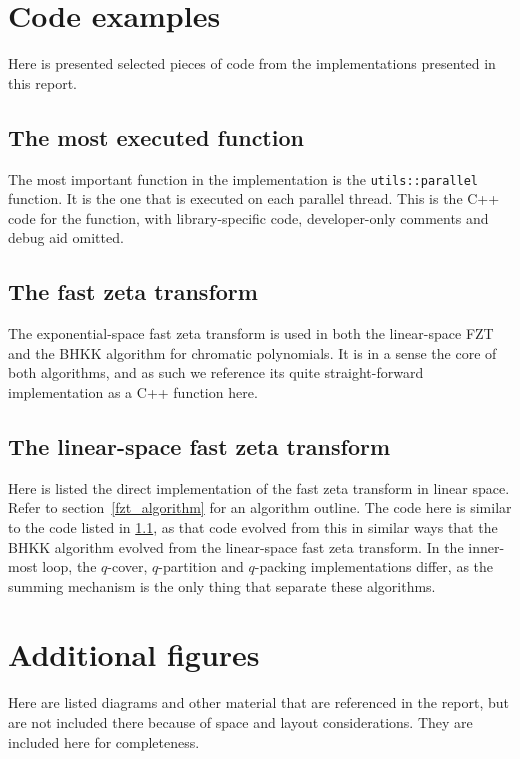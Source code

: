 \documentclass{cslthse-msc}
\newcommand{\code}{\texttt}
\begin{document}
\begin{appendices}
 \chapter{Code examples}
 Here is presented selected pieces of code from the implementations presented in this report.
 
 \section{The most executed function}\label{fztlin_code}
 The most important function in the implementation is the \code{utils::parallel} function. It is the one that is executed on each parallel thread. This is the C++ code for the function, with library-specific code, developer-only comments and debug aid omitted.
 
 \section{The fast zeta transform}\label{fzt_code}
 The exponential-space fast zeta transform is used in both the linear-space FZT and the BHKK algorithm for chromatic polynomials. It is in a sense the core of both algorithms, and as such we reference its quite straight-forward implementation as a C++ function here.
 
 
 \section{The linear-space fast zeta transform}\label{fztlin_set_code}
 Here is listed the direct implementation of the fast zeta transform in linear space. Refer to section~\ref{fzt_algorithm} for an algorithm outline. The code here is similar to the code listed in \ref{fztlin_code}, as that code evolved from this in similar ways that the BHKK algorithm evolved from the linear-space fast zeta transform. In the inner-most loop, the $q$-cover, $q$-partition and $q$-packing implementations differ, as the summing mechanism is the only thing that separate these algorithms.
 
 
 \chapter{Additional figures}
 Here are listed diagrams and other material that are referenced in the report, but are not included there because of space and layout considerations. They are included here for completeness.
 

\end{appendices}
\end{document}
